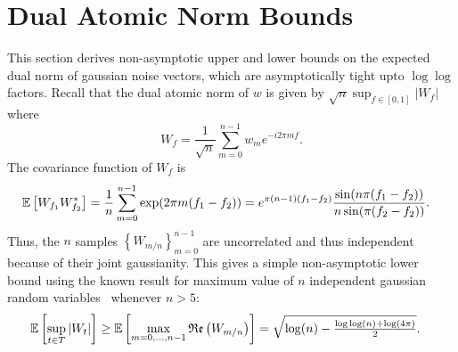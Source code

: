 \section{Dual Atomic Norm Bounds}
\label{proof:dual-norm-bounds}
This section derives non-asymptotic upper and lower bounds on the expected dual norm of gaussian noise vectors, which are asymptotically tight upto $\log\log$ factors. Recall that the dual atomic norm of $w$ is given by $\sqrt{n}\sup_{f \in [0,1]}|W_f|$ where
\begin{equation*}
W_f = \frac{1}{\sqrt{n}}\sum_{m=0}^{n-1}{w_m e^{-i2 \pi m f}}.
\end{equation*}
The covariance function of $W_f$ is
\begin{align*}
\operatorname{\mathbb{E}}\left[W_{f_1} W_{f_2}^*\right] &= \frac{1}{n}\sum_{m=0}^{n-1} \exp(2\pi m (f_1 - f_2)) = e^{\pi (n - 1) (f_1-f_2)} \frac{\sin(n \pi (f_1 - f_2) ) }{ n \sin(\pi (f_2 - f_2))}.
\end{align*}
Thus, the $n$ samples $\left\{W_{m/n}\right\}_{m=0}^{n-1}$ are uncorrelated and thus independent because of their joint gaussianity. This gives a simple non-asymptotic lower bound using the known result for maximum value of $n$ independent gaussian random variables~\cite{lr76} whenever $n > 5$:
\begin{align*}
\operatorname{\mathbb{E}}\left[\sup_{t \in T} \left| W_t \right| \right] &\geq \operatorname{\mathbb{E}}\left[\max_{m = 0, \ldots, n-1} \mathop{\mathfrak{Re}}\left( W_{m/n} \right)  \right] = \sqrt{\log(n) - \tfrac{ \log\log(n) + \log(4\pi)}{2}}.
\end{align*}


